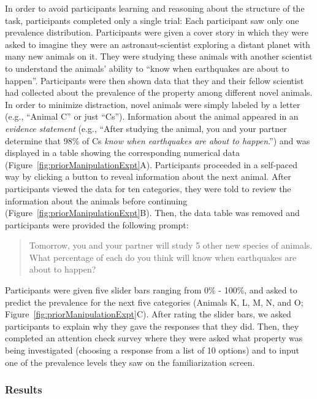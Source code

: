 \documentclass[floatsintext,man]{apa6}
\begin{document}
%
In order to avoid participants learning and reasoning about the structure of the task, participants completed only a single trial: Each participant saw only one prevalence distribution.
Participants were given a cover story in which they were asked to imagine they were an astronaut-scientist exploring a distant planet with many new animals on it.
They were studying these animals with another scientist to understand the animals' ability to \enquote{know when earthquakes are about to happen}.
Participants were then shown data that they and their fellow scientist had collected about the prevalence of the property among different novel animals.
In order to minimize distraction, novel animals were simply labeled by a letter (e.g., \enquote{Animal C} or just \enquote{Cs}).
Information about the animal appeared in an \emph{evidence statement} (e.g., \enquote{After studying the animal, you and your partner determine that 98\% of Cs \emph{know when earthquakes are about to happen}.}) and was displayed in a table showing the corresponding numerical data (Figure~\ref{fig:priorManipulationExpt}A).
Participants proceeded in a self-paced way by clicking a button to reveal information about the next animal.
After participants viewed the data for ten categories, they were told to review the information about the animals before continuing (Figure~\ref{fig:priorManipulationExpt}B).
Then, the data table was removed and participants were provided the following prompt:

\begin{quote}
Tomorrow, you and your partner will study 5 other new species of animals. What percentage of each do you think will know when earthquakes are about to happen?
\end{quote}

Participants were given five slider bars ranging from 0\% - 100\%, and asked to predict the prevalence for the next five categories (Animals K, L, M, N, and O; Figure~\ref{fig:priorManipulationExpt}C).
After rating the slider bars, we asked participants to explain why they gave the responses that they did.
Then, they completed an attention check survey where they were asked what property was being investigated (choosing a response from a list of 10 options) and to input one of the prevalence levels they saw on the familiarization screen.

\hypertarget{results-1}{%
\subsubsection{Results}\label{results-1}}
\end{document}
